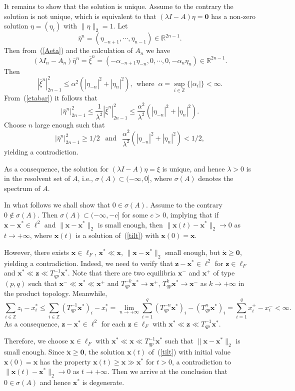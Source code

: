 \documentclass[12pt]{article}
\newcommand{\R}{\mathbb{R}}
\newcommand{\Z}{\mathbb{Z}}
\newcommand{\emark}{\hfill\hspace{1em}\framebox[0.5em]{\rule{0cm}{0em}}
\vspace{2mm}}
\newcommand{\refer}[1]{~(\ref{#1})}
\newcommand{\zbf}{{\mathbf{z}}}
\newcommand{\xbf}{{\mathbf{x}}}
\newcommand{\zero}{{\mathbf{0}}}
\begin{document}
  It remains to show that the solution is unique. Assume to the contrary the solution is not unique, which is equivalent to that $(\lambda I-A)\eta=\zero$ has a non-zero solution $\eta=(\eta_i)$ with $\|\eta\|_2=1$. Let
  $$
  \bar{\eta}^n=(\eta_{-n+1},\cdots,\eta_{n-1})\in\R^{2n-1}.
  $$
  Then from\refer{Aeta} and the calculation of $A_n$ we have
  $$
  (\lambda I_n-A_n)\bar{\eta}^n=\bar{\xi}^n=(-\alpha_{-n+1}\eta_{-n},0,\cdots,0,
  -\alpha_n\eta_n)\in\R^{2n-1}.
  $$
  Then
  $$
  |\bar{\xi}^n|_{2n-1}^2\leq \alpha^2(|\eta_{-n}|^2+|\eta_n|^2), \ \ \mbox{where }
  \ \alpha=\sup_{i\in\Z}\{|\alpha_i|\}<\infty.
  $$
  From\refer{etabar} it follows that
  $$
  |\bar{\eta}^n|_{2n-1}^2\leq \frac{1}{\lambda^2}|\bar{\xi}^n|_{2n-1}^2\leq
  \frac{\alpha^2}{\lambda^2}\left( |\eta_{-n}|^2+|\eta_n|^2\right).
  $$
  Choose $n$ large enough such that
  $$
  |\bar{\eta}^n|_{2n-1}^2\geq 1/2 \ \ \mbox{ and }\ \ \frac{\alpha^2}{\lambda^2}\left( |\eta_{-n}|^2+|\eta_n|^2\right)<1/2,
  $$
  yielding a contradiction.

  As a consequence, the solution for $(\lambda I-A)\eta=\xi$ is unique, and hence $\lambda>0$ is in the resolvent set of $A$, i.e., $\sigma(A)\subset (-\infty,0]$, where $\sigma(A)$ denotes the spectrum of $A$.

In what follows we shall show that $0\in\sigma(A)$. Assume to the contrary $0\not\in\sigma(A)$. Then $\sigma(A)\subset (-\infty,-c]$ for some $c>0$, implying that if $\xbf-\xbf^*\in\ell^2$ and $\|\xbf-\xbf^*\|_2$ is small enough, then $\|\xbf(t)-\xbf^*\|_2\to 0$ as $t\to +\infty$, where $\xbf(t)$ is a solution of\refer{tilt} with $\xbf(0)=\xbf$.

However, there exists $\xbf\in\ell_F$, $\xbf^*\ll\xbf$, $\|\xbf-\xbf^*\|_2$ small enough, but $\dot{\xbf}\geq\zero$, yielding a contradiction. Indeed, we need to verify that $\zbf-\xbf^*\in\ell^2$ for $\zbf\in\ell_F$ and $\xbf^*\ll\zbf\ll T_{qp}^{-1}\xbf^*$. Note that
there are two equilibria $\xbf^-$ and $\xbf^+$ of type $(p,q)$ such that $\xbf^-\ll\xbf^*\ll\xbf^+$ and $T_{qp}^{-k}\xbf^*\to \xbf^+$, $T_{qp}^k\xbf^*\to\xbf^-$ as $k\to +\infty$ in the product topology. Meanwhile,
$$
\sum_{i\in\Z}z_i-x_i^*\leq\sum_{i\in\Z}(T_{qp}^{-1}\xbf^*)_i-x_i^*=
\lim_{n\to +\infty}\sum_{i=1}^q(T_{qp}^{-n}\xbf^*)_i-(T_{qp}^n\xbf^*)_i
=\sum_{i=1}^q x_i^+-x_i^-<\infty.
$$
As a consequence, $\zbf-\xbf^*\in\ell^2$ for each $\zbf\in\ell_F$ with $\xbf^*\ll\zbf\ll T_{qp}^{-1}\xbf^*$.

Therefore, we  choose  $\xbf\in\ell_F$ with $\xbf^*\ll\xbf\ll T_{qp}^{-1}\xbf^*$ such that $\|\xbf-\xbf^*\|_2$ is small enough. Since $\dot{\xbf}\geq\zero$, the solution $\xbf(t)$ of\refer{tilt} with initial value $\xbf(0)=\xbf$ has the property $\xbf(t)\geq\xbf\gg \xbf^*$ for $t>0$, a contradiction to $\|\xbf(t)-\xbf^*\|_2\to 0$ as $t\to +\infty$. Then we arrive at the conclusion that $0\in\sigma(A)$ and hence $\xbf^*$ is degenerate.  \emark
\end{document}
